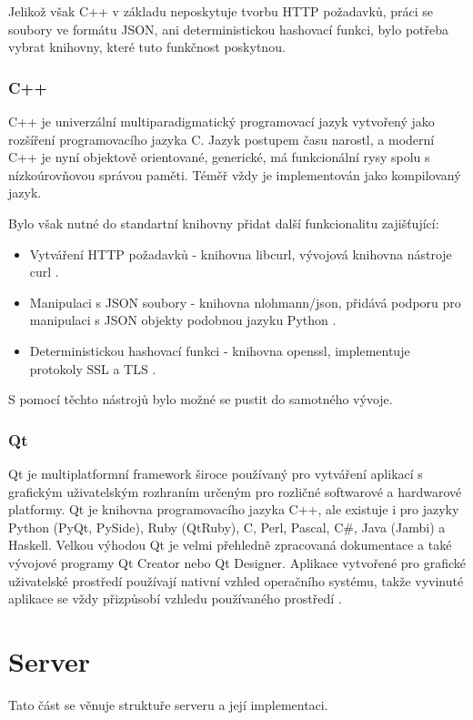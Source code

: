 \documentclass[
  glossaries,
]{kidiplom}
\begin{document}
Jelikož však C++ v základu neposkytuje tvorbu HTTP požadavků, práci se soubory ve formátu JSON, ani deterministickou hashovací funkci, bylo potřeba vybrat knihovny, které tuto funkčnost poskytnou.

\subsubsection{C++}
C++ je univerzální multiparadigmatický programovací jazyk vytvořený jako rozšíření programovacího jazyka C. Jazyk postupem času narostl, a moderní C++ je nyní objektově orientované, generické, má funkcionální rysy spolu s nízkoúrovňovou správou paměti. Téměř vždy je implementován jako kompilovaný jazyk. \cite{C++}


Bylo však nutné do standartní knihovny přidat další funkcionalitu zajišťující:
\begin{itemize}
\item Vytváření HTTP požadavků - knihovna libcurl, vývojová knihovna nástroje curl \cite{LIBCURL}.
\item Manipulaci s JSON soubory - knihovna nlohmann/json, přidává podporu pro manipulaci s JSON objekty podobnou jazyku Python \cite{JSONCPP}.
\item Deterministickou hashovací funkci - knihovna openssl, implementuje protokoly SSL a TLS \cite{OPENSSL}.
\end{itemize}
S pomocí těchto nástrojů bylo možné se pustit do samotného vývoje.

\subsubsection{Qt}
Qt je multiplatformní framework široce používaný pro vytváření aplikací s grafickým uživatelským rozhraním určeným pro rozličné softwarové a hardwarové platformy. Qt je knihovna programovacího jazyka C++, ale existuje i pro jazyky Python (PyQt, PySide), Ruby (QtRuby), C, Perl, Pascal, C\#, Java (Jambi) a Haskell. Velkou výhodou Qt je velmi přehledně zpracovaná dokumentace a také vývojové programy Qt Creator nebo Qt Designer. Aplikace vytvořené pro grafické uživatelské prostředí používají nativní vzhled operačního systému, takže vyvinuté aplikace se vždy přizpůsobí vzhledu používaného prostředí \cite{QT}.

\clearpage
\section{Server}
Tato část se věnuje struktuře serveru a její implementaci. 
\end{document}
